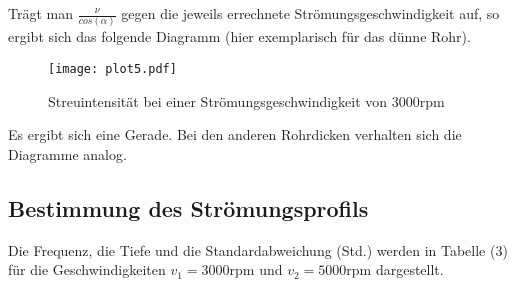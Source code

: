 Trägt man $\frac{\nu}{cos(\alpha)}$ gegen die jeweils errechnete Strömungsgeschwindigkeit auf, so ergibt sich
das folgende Diagramm (hier exemplarisch für das dünne Rohr).

\begin{figure}
  \centering
  \texttt{[image: plot5.pdf]}
  \caption{Streuintensität bei einer Strömungsgeschwindigkeit von 3000rpm}
  \label{fig:plot}
\end{figure}

Es ergibt sich eine Gerade. Bei den anderen Rohrdicken verhalten sich die Diagramme analog.

\subsection{Bestimmung des Strömungsprofils}

Die Frequenz, die Tiefe und die Standardabweichung (Std.) werden in Tabelle (3) für die Geschwindigkeiten $v_1 = 3000$rpm und $v_2 = 5000$rpm dargestellt.

